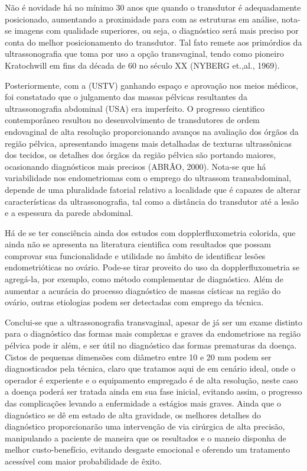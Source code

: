 \documentclass[12pt]{article} %
\begin{document}
Não é novidade há no mínimo 30 anos que quando o transdutor é adequadamente posicionado, aumentando a proximidade para com as estruturas em análise, nota-se imagens com qualidade superiores, ou seja, o diagnóstico será mais preciso por conta do melhor posicionamento do transdutor. Tal fato remete aos primórdios da ultrassonografia que toma por uso a opção transvaginal, tendo como pioneiro Kratochwill em fins da década de 60 no século XX (NYBERG et.,al., 1969). 

Posteriormente, com a (USTV) ganhando espaço e aprovação nos meios médicos, foi constatado que o julgamento das massas pélvicas resultantes da ultrassonografia abdominal (USA) era imperfeito. O progresso cientifico contemporâneo resultou no desenvolvimento de transdutores de ordem endovaginal de alta resolução proporcionando avanços na avaliação dos órgãos da região pélvica, apresentando imagens mais detalhadas de texturas ultrassônicas dos tecidos, os detalhes dos órgãos da região pélvica são portando maiores, ocasionando diagnósticos mais precisos (ABRÃO, 2000). Nota-se que há variabilidade nos endometriomas com o emprego do ultrassom transabdominal, depende de uma pluralidade fatorial relativo a localidade que é capazes de alterar características da ultrassonografia, tal como a distância do transdutor até a lesão e a espessura da parede abdominal. 

Há de se ter consciência ainda dos estudos com dopplerfluxometria colorida, que ainda não se apresenta na literatura cientifica com resultados que possam comprovar sua
funcionalidade e utilidade no âmbito de identificar lesões endometrióticas no ovário. Pode-se tirar proveito do uso da dopplerfluxometria se agregá-la, por exemplo, como método complementar de diagnóstico. Além de aumentar a acurácia do processo diagnóstico de massas císticas na região do ovário, outras etiologias podem ser detectadas com emprego da técnica. 

Conclui-se que a ultrassonografia transvaginal, apesar de já ser um exame distinto para o diagnóstico das formas mais complexas e graves da endometriose na região pélvica pode ir além, e ser útil no diagnóstico das formas prematuras da doença. Cistos de pequenas dimensões com diâmetro entre 10 e 20 mm podem ser diagnosticados pela técnica, claro que tratamos aqui de em cenário ideal, onde o operador é experiente e o equipamento empregado é de alta resolução, neste caso a doença poderá ser tratada ainda em sua fase inicial, evitando assim, o progresso das complicações levando a enfermidade a estágios mais graves.  Ainda que o diagnóstico se dê em estado de alta gravidade, os melhores detalhes do diagnóstico proporcionarão uma intervenção de via cirúrgica de alta precisão, manipulando a paciente de maneira que os resultados e o maneio disponha de melhor custo-benefício, evitando desgaste emocional e oferendo um tratamento acessível com maior probabilidade de êxito.     
\end{document}

